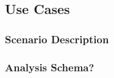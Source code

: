 \subsection{Use Cases}
  \subsubsection{Scenario Description}
  \subsubsection{Analysis Schema?}









